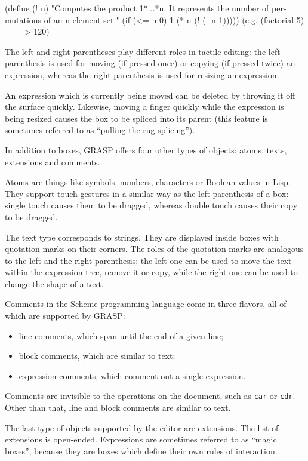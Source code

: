 \documentclass[sigconf]{acmart}
\newenvironment{Snippet}{\Verbatim[samepage=true]}{\endVerbatim}
\begin{document}
\begin{Snippet}
(define (! n)
"Computes the product 1*...*n.
It represents the number of per-
mutations of an n-element set."
  (if (<= n 0)
      1
      (* n (! (- n 1))))) 
(e.g. (factorial 5) ===> 120)
\end{Snippet}

The left and right parentheses play different roles in 
tactile editing: the left parenthesis is used for moving
(if pressed once) or copying (if pressed twice) an expression,
whereas the right parenthesis is used for resizing an expression.

An expression which is currently being moved can be deleted
by throwing it off the surface quickly. Likewise, moving
a finger quickly while the expression is being resized
causes the box to be spliced into its parent (this feature
is sometimes referred to as ``pulling-the-rug splicing'').

In addition to boxes, GRASP offers four other types
of objects: atoms, texts, extensions and comments.

Atoms are things like symbols, numbers, characters
or Boolean values in Lisp. They support touch
gestures in a similar way as the left parenthesis
of a box: single touch causes them to be dragged,
whereas double touch causes their copy to be dragged.

The text type corresponds to strings. They are 
displayed inside boxes with quotation marks
on their corners. The roles of the quotation
marks are analogous to the left and the right
parenthesis: the left one can be used to
move the text within the expression tree,
remove it or copy, while the right one can be used
to change the shape of a text.

Comments in the Scheme programming language come in
three flavors, all of which are supported by GRASP:
\begin{itemize}
\item line comments, which span until the end of a given line;
\item block comments, which are similar to text;
\item expression comments, which comment out a single expression.
\end{itemize}

Comments are invisible to the operations
on the document, such as \texttt{car} or \texttt{cdr}. 
Other than that, line and block comments are similar to text.

The last type of objects supported by the editor
are extensions. The list of extensions is open-ended.
Expressions are sometimes referred to as ``magic boxes'',
because they are boxes which define their own rules
of interaction.
\end{document}

